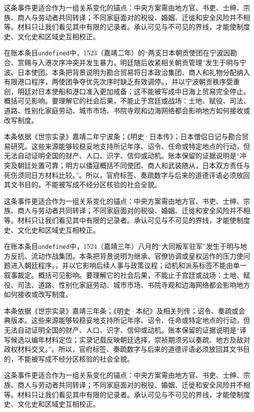 这条事件更适合作为一组关系变化的锚点：中央方案需由地方官、书吏、士绅、宗族、商人与劳动者共同转译；不同家庭面对的税役、婚姻、迁徙和安全风险并不相等。材料只让我们看见其中有限的记录者。承认可见与不可见的界线，才能使制度史、文化史和区域史互相校正。

在账本条目\texttt{undefined}中，1523（嘉靖二年）的“两支日本朝贡使团在宁波因勘合、赏赐与入港次序冲突并发生暴力，明廷随后收紧相关朝贡管理”发生于明与宁波、日本使团。本条把背景说明为勘合贸易将日本政治集团、商人和礼物分配纳入有限港口程序，两使团争夺优先次序时缺乏有效调停。，并以宁波朝贡秩序受重创，明廷对日本使船和港口准入更加戒备；这不能被写成中日海上贸易完全停止。概括可见影响。要理解它的社会后果，不能止于宫廷或战场：土地、赋役、司法、道路、性别化家庭劳动、城市市场、书院寺观和边海网络都会影响地方如何接收或改写制度。

本条依据《世宗实录》嘉靖二年宁波条；《明史·日本传》；日本僧侣日记与勘合贸易研究。这些来源能够较稳妥地支持所记年序、诏令、任命或特定地点的行动，但无法自动证明全国的财产、人口、识字、信仰或动机。账本保留的证据说明是“冲突及朝廷处置可靠；明方以倭寇概括不同使团、商人和武装随从，日本双方责任与死伤须同日方材料比较。”。所以，官府标签、奏疏数字与后来的道德评语必须放回其文书目的，不能被写成不经分区核验的社会全貌。

这条事件更适合作为一组关系变化的锚点：中央方案需由地方官、书吏、士绅、宗族、商人与劳动者共同转译；不同家庭面对的税役、婚姻、迁徙和安全风险并不相等。材料只让我们看见其中有限的记录者。承认可见与不可见的界线，才能使制度史、文化史和区域史互相校正。

在账本条目\texttt{undefined}中，1524（嘉靖三年）八月的“大同叛军驻军”发生于明与地方反抗、流动作战集团。本条把背景说明为继承、官僚协调或皇权运作的压力使问题进入朝廷程序。，并以它影响后续人事与政策议程；动机和派系标签不能由单一叙事裁定。概括可见影响。要理解它的社会后果，不能止于宫廷或战场：土地、赋役、司法、道路、性别化家庭劳动、城市市场、书院寺观和边海网络都会影响地方如何接收或改写制度。

本条依据《世宗实录》嘉靖三年条；《明史·本纪》及相关列传；诏令、奏疏或会典版本。这些来源能够较稳妥地支持所记年序、诏令、任命或特定地点的行动，但无法自动证明全国的财产、人口、识字、信仰或动机。账本保留的证据说明是“译写候选以编年材料定位；实录记载反映朝廷选择，崇祯期须另以奏疏、地方及敌对政权材料交叉。”。所以，官府标签、奏疏数字与后来的道德评语必须放回其文书目的，不能被写成不经分区核验的社会全貌。

这条事件更适合作为一组关系变化的锚点：中央方案需由地方官、书吏、士绅、宗族、商人与劳动者共同转译；不同家庭面对的税役、婚姻、迁徙和安全风险并不相等。材料只让我们看见其中有限的记录者。承认可见与不可见的界线，才能使制度史、文化史和区域史互相校正。

